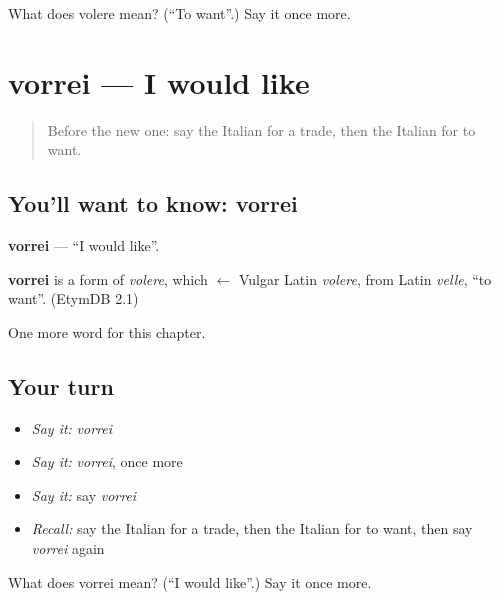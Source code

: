 \begin{tcolorbox}[breakable,colback=teal!4,colframe=teal!35!black,title={Before you move on}]
What does volere mean? (\textquotedblleft{}To want\textquotedblright{}.) Say it once more.
\end{tcolorbox}
\section[vorrei]{vorrei — I would like}

\label{lesson:IT-C86-vorrei}



\begin{quote}
Before the new one: say the Italian for a trade, then the Italian for to want.
\end{quote}

\subsection*{You'll want to know: vorrei}
\textbf{vorrei} — \textquotedblleft{}I would like\textquotedblright{}.

\begin{cousinweb}
\textbf{vorrei} is a form of \emph{volere}, which $\leftarrow$ Vulgar Latin \emph{volere}, from Latin \emph{velle}, \textquotedblleft{}to want\textquotedblright{}. (EtymDB 2.1)
\end{cousinweb}

\begin{grammarlens}[title={What you've built}]
One more word for this chapter.
\end{grammarlens}

\subsection*{Your turn}
\begin{itemize}
\raggedright
  \item \emph{Say it:} \emph{vorrei}
  \item \emph{Say it:} \emph{vorrei}, once more
  \item \emph{Say it:} say \emph{vorrei}
  \item \emph{Recall:} say the Italian for a trade, then the Italian for to want, then say \emph{vorrei} again
\end{itemize}

\begin{tcolorbox}[breakable,colback=teal!4,colframe=teal!35!black,title={Before you move on}]
What does vorrei mean? (\textquotedblleft{}I would like\textquotedblright{}.) Say it once more.
\end{tcolorbox}
